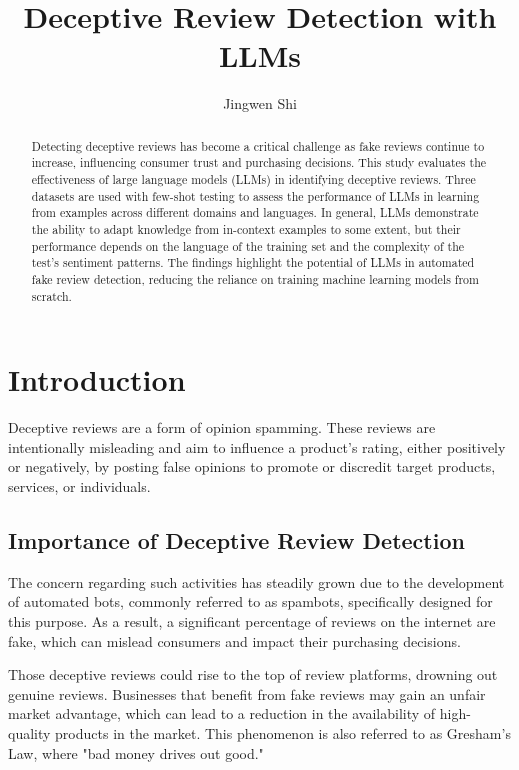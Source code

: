 \documentclass[sigconf, nonacm]{acmart}
\theoremstyle{definition}
\begin{document}
\title{Deceptive Review Detection with LLMs}

\author{Jingwen Shi}

\renewcommand{\shortauthors}{Jingwen Shi}

\begin{abstract}
  Detecting deceptive reviews has become a critical challenge as fake reviews continue to increase, influencing consumer trust and purchasing decisions. This study evaluates the effectiveness of large language models (LLMs) in identifying deceptive reviews. Three datasets are used with few-shot testing to assess the performance of LLMs in learning from examples across different domains and languages. In general, LLMs demonstrate the ability to adapt knowledge from in-context examples to some extent, but their performance depends on the language of the training set and the complexity of the test's sentiment patterns. The findings highlight the potential of LLMs in automated fake review detection, reducing the reliance on training machine learning models from scratch.
\end{abstract}

\maketitle

\section{Introduction}
Deceptive reviews are a form of opinion spamming. These reviews are intentionally misleading and aim to influence a product's rating, either positively or negatively, by posting false opinions to promote or discredit target products, services, or individuals.

\subsection{Importance of Deceptive Review Detection}
The concern regarding such activities has steadily grown due to the development of automated bots, commonly referred to as spambots, specifically designed for this purpose. As a result, a significant percentage of reviews on the internet are fake, which can mislead consumers and impact their purchasing decisions.

Those deceptive reviews could rise to the top of review platforms, drowning out genuine reviews. Businesses that benefit from fake reviews may gain an unfair market advantage, which can lead to a reduction in the availability of high-quality products in the market. This phenomenon is also referred to as Gresham's Law, where "bad money drives out good."
\end{document}
